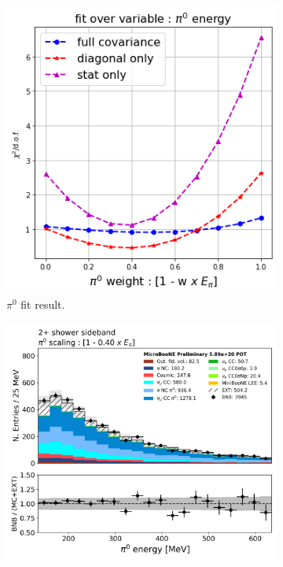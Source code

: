 \begin{figure}[H]
\begin{center}
\begin{subfigure}[b]{0.27\textwidth}
    \includegraphics[width=1.00\textwidth]{pi0/pi0tune/chisq_pi0energy.png}
    \caption{\label{fig:pi0fitresult} $\pi^0$ fit result.}
    \end{subfigure}
    \begin{subfigure}[b]{0.33\textwidth}
    \centering
    \includegraphics[width=1.00\textwidth]{pi0/pi0tune/pi0energy_040_scaling.png}

\end{subfigure}
\end{center}
\end{figure}
